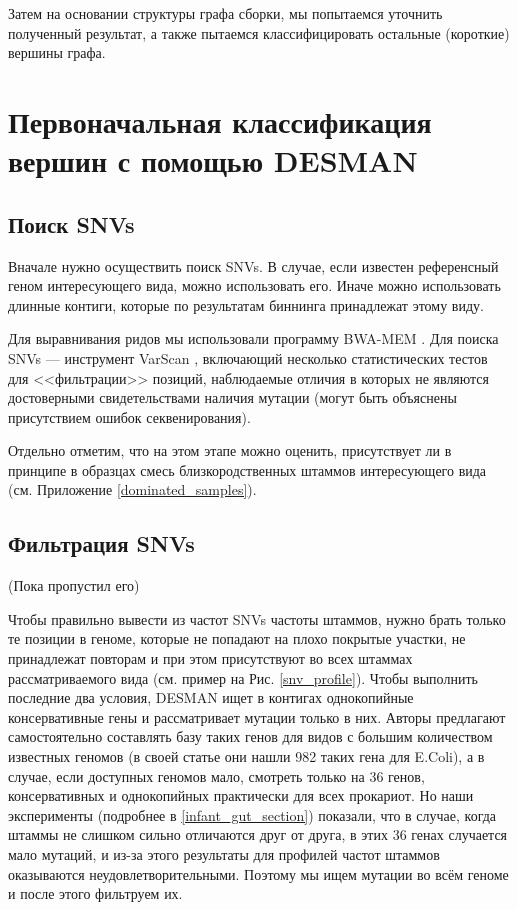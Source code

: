 \documentclass{spbau-diploma}
\begin{document}
Затем на основании структуры графа сборки, мы попытаемся уточнить полученный результат, а также  пытаемся классифицировать остальные (короткие) вершины графа.



\section{Первоначальная классификация вершин с помощью DESMAN}

\subsection{Поиск SNVs}

Вначале нужно осуществить поиск SNVs. В случае, если известен референсный геном интересующего вида, можно использовать его. Иначе можно использовать длинные контиги, которые по результатам биннинга принадлежат этому виду.

Для выравнивания ридов мы использовали программу BWA-MEM \cite{bwa_mem}. Для поиска SNVs --- инструмент VarScan \cite{VarScan}, включающий несколько статистических тестов для <<фильтрации>> позиций, наблюдаемые отличия в которых не являются достоверными свидетельствами наличия мутации (могут быть объяснены присутствием ошибок секвенирования). 

Отдельно отметим, что на этом этапе можно оценить, присутствует ли в принципе в образцах смесь близкородственных штаммов интересующего вида (см. Приложение  \ref{dominated_samples}).

\subsection{Фильтрация SNVs} (Пока пропустил его)

Чтобы правильно вывести из частот SNVs частоты штаммов, нужно брать только те позиции в геноме, которые не попадают на плохо покрытые участки, не принадлежат повторам и при этом присутствуют во всех штаммах рассматриваемого вида (см. пример на Рис. \ref{snv_profile}). Чтобы выполнить последние два условия, DESMAN ищет в контигах однокопийные консервативные гены и рассматривает мутации только в них. Авторы предлагают самостоятельно составлять базу таких генов для видов с большим количеством известных геномов (в своей статье они нашли 982 таких гена для E.Coli), а в случае, если доступных геномов мало, смотреть только на 36 генов, консервативных и однокопийных практически для всех прокариот. Но наши эксперименты (подробнее в \ref{infant_gut_section}) показали, что в случае, когда штаммы не слишком сильно отличаются друг от друга, в этих 36 генах случается мало мутаций, и из-за этого результаты для профилей частот штаммов оказываются неудовлетворительными. Поэтому мы ищем мутации во всём геноме и после этого фильтруем их.
\end{document}
